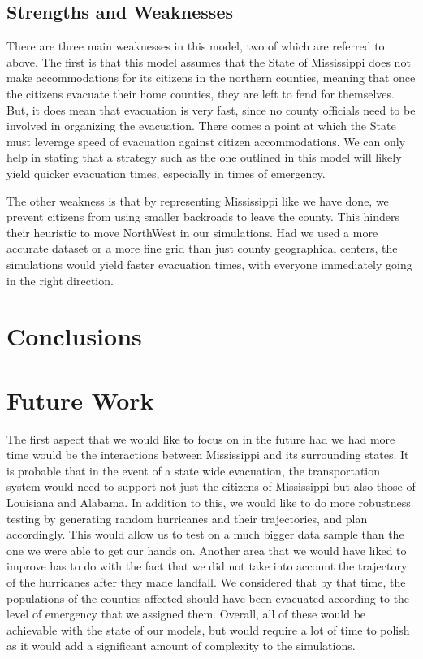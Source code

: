 \documentclass[titlepage]{article}
\begin{document}
  \subsection{Strengths and Weaknesses}
    \par There are three main weaknesses in this model, two of which are referred to above. The first is that this model assumes that the State of Mississippi does not make accommodations for its citizens in the northern counties, meaning that once the citizens evacuate their home counties, they are left to fend for themselves. But, it does mean that evacuation is very fast, since no county officials need to be involved in organizing the evacuation. There comes a point at which the State must leverage speed of evacuation against citizen accommodations. We can only help in stating that a strategy such as the one outlined in this model will likely yield quicker evacuation times, especially in times of emergency.
    \par The other weakness is that by representing Mississippi like we have done, we prevent citizens from using smaller backroads to leave the county. This hinders their heuristic to move NorthWest in our simulations. Had we used a more accurate dataset or a more fine grid than just county geographical centers, the simulations would yield faster evacuation times, with everyone immediately going in the right direction.

\section{Conclusions}
\label{sec:conclusions}


\section{Future Work}
\label{sec:future}
The first aspect that we would like to focus on in the future had we had more time would be the interactions between Mississippi and its surrounding states. It is probable that in the event of a state wide evacuation, the transportation system would need to support not just the citizens of Mississippi but also those of Louisiana and Alabama.
\newline
In addition to this, we would like to do more robustness testing by generating random hurricanes and their trajectories, and plan accordingly. This would allow us to test on a much bigger data sample than the one we were able to get our hands on.
\newline
Another area that we would have liked to improve has to do with the fact that we did not take into account the trajectory of the hurricanes after they made landfall. We considered that by that time, the populations of the counties affected should have been evacuated according to the level of emergency that we assigned them.\newline
Overall, all of these would be achievable with the state of our models, but would require a lot of time to polish as it would add a significant amount of complexity to the simulations.
\end{document}
